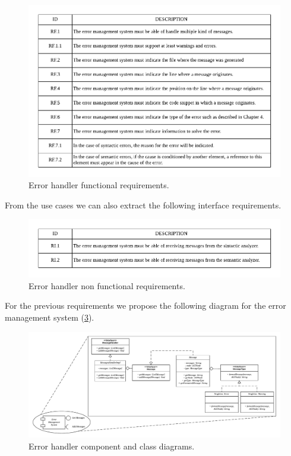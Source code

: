\begin{figure}[h!]
    \includegraphics[width=\textwidth]{images/err-hand-reqf.pdf}
    \centering
    \caption[Error handler functional requirements]{Error handler functional requirements.}
    \label{fig:err-hand-reqf}
\end{figure}

From the use cases we can also extract the following interface requirements.

\begin{figure}[h!]
    \includegraphics[width=\textwidth]{images/err-hand-reqnf.pdf}
    \centering
    \caption[Error handler non functional requirements]{Error handler non functional requirements.}
    \label{fig:err-hand-reqnf}
\end{figure}

For the previous requirements we propose the following diagram for the error management system (\cref{fig:err-hand-diag}).

\begin{figure}[h!]
    \includegraphics[width=\textwidth]{images/err-hand-diagram.pdf}
    \centering
    \caption[Error handler component and class diagrams]{Error handler component and class diagrams.}
    \label{fig:err-hand-diag}
\end{figure}


